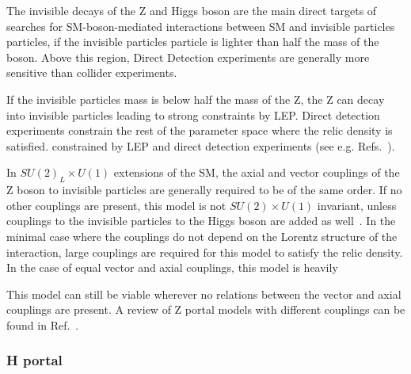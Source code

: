 
The invisible decays of the Z and Higgs boson are the main direct targets of searches for SM-boson-mediated interactions between SM and invisible particles particles, if the invisible particles particle is lighter than half the mass of the boson. Above this region, Direct Detection experiments are generally more sensitive than collider experiments. 


If the invisible particles mass is below half the mass of the Z, the Z can decay into invisible particles leading to strong constraints by LEP. Direct detection experiments constrain the rest of the parameter space 
where the relic density is satisfied. 
constrained by LEP and direct detection experiments (see e.g. Refs.~\cite{Arcadi:2014lta,Escudero:2016gzx}).

In $SU(2)_L \times U(1)$ extensions of the SM, the axial and vector couplings of the Z boson to invisible particles are generally required to be of the same order. If no other couplings are present, this model is not $SU(2) \times U(1)$ invariant, unless couplings to the invisible particles to the Higgs boson are added as well~\cite{Kahlhoefer:2015bea}. 
In the minimal case where the couplings do not depend on the Lorentz structure of the interaction, 
large couplings are required for this model to satisfy the relic density. 
In the case of equal vector and axial couplings, this model is heavily 

This model can still be viable wherever no relations between the vector and axial couplings are present. A review of Z portal models with different couplings can be found in Ref.~\cite{Arcadi:2014lta}. 


\subsubsection{H portal}

